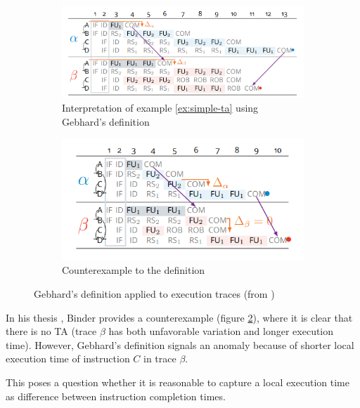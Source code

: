 \begin{figure}[!htb]
    \centering
    \begin{subfigure}[t]{0.5\textwidth}
        \centering
        \includegraphics[width=\textwidth]{figures/step-func-good.png}
        \caption{Interpretation of example \ref{ex:simple-ta} using Gebhard's definition}
        \label{fig:step-good}
    \end{subfigure}
    \hfill
    \begin{subfigure}[t]{0.49\textwidth}
        \centering
        \includegraphics[width=\textwidth]{figures/step-func-bad.png}
        \caption{Counterexample to the definition}
        \label{fig:step-bad}
    \end{subfigure}
    \caption{Gebhard's definition applied to execution traces (from \cite{binder_definitions_2022})}
    \label{fig:step}
\end{figure}

In his thesis \cite{binder_definitions_2022}, Binder provides a counterexample (figure \ref{fig:step-bad}), where it is clear that there is no TA (trace $\beta$ has both unfavorable variation and longer execution time). However, Gebhard's definition signals an anomaly because of shorter local execution time of instruction $C$ in trace $\beta$.

This poses a question whether it is reasonable to capture a local execution time as difference between instruction completion times. 

